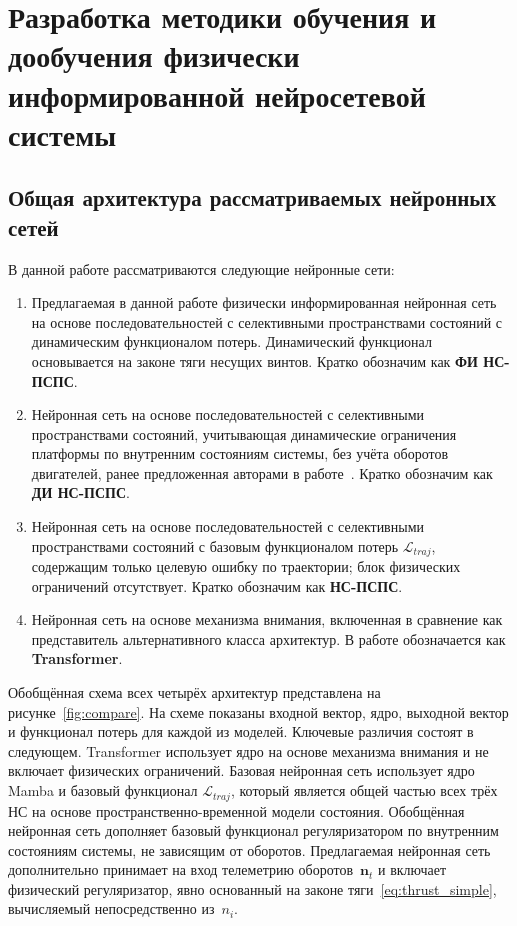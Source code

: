 \chapter{Разработка методики обучения и дообучения физически информированной нейросетевой системы}
\label{ch:3}


\section{Общая архитектура рассматриваемых нейронных сетей}
\label{sec:common_arch}


В данной работе рассматриваются следующие нейронные сети:
\begin{enumerate}
	\item Предлагаемая в данной работе физически информированная нейронная сеть на основе последовательностей
	с селективными пространствами состояний с динамическим функционалом потерь.
	Динамический функционал основывается на законе тяги несущих винтов.
	Кратко обозначим как \textbf{ФИ НС-ПСПС}.
	\item Нейронная сеть на основе последовательностей с селективными
	пространствами состояний, учитывающая динамические ограничения платформы
	по внутренним состояниям системы, без учёта оборотов
	двигателей, ранее предложенная авторами в работе~\cite{Sidorenko2026}.
	Кратко обозначим как \textbf{ДИ НС-ПСПС}.
	\item Нейронная сеть на основе последовательностей с селективными
	пространствами состояний с базовым функционалом потерь $\mathcal{L}_{traj}$,
	содержащим только целевую ошибку по траектории; блок физических ограничений
	отсутствует. Кратко обозначим как \textbf{НС-ПСПС}.
	\item Нейронная сеть на основе механизма внимания, включенная в сравнение
	как представитель альтернативного класса архитектур.
	В работе обозначается как \textbf{Transformer}.
\end{enumerate}

Обобщённая схема всех четырёх архитектур представлена на
рисунке~\ref{fig:compare}.
На схеме показаны входной вектор, ядро, выходной вектор и функционал потерь
для каждой из моделей.
Ключевые различия состоят в следующем.
Transformer использует ядро на основе механизма внимания и не включает
физических ограничений.
Базовая нейронная сеть использует ядро Mamba и базовый функционал
$\mathcal{L}_{traj}$, который является общей частью всех трёх НС на основе
пространственно-временной модели состояния.
Обобщённая нейронная сеть дополняет базовый функционал регуляризатором по
внутренним состояниям системы, не зависящим от оборотов.
Предлагаемая нейронная сеть дополнительно принимает на вход телеметрию
оборотов~$\mathbf{n}_t$ и включает физический регуляризатор, явно основанный
на законе тяги~\eqref{eq:thrust_simple}, вычисляемый непосредственно из~$n_i$.

